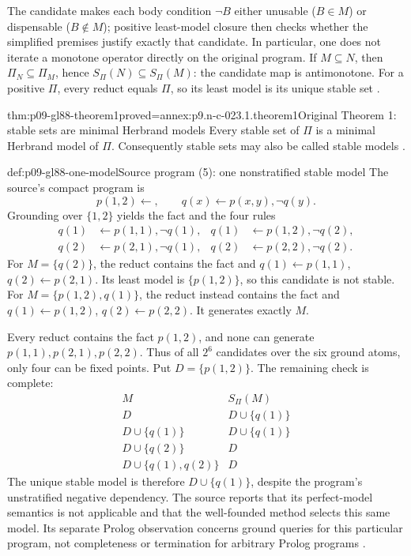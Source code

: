 The candidate makes each body condition \(\neg B\) either unusable
(\(B\in M\)) or dispensable (\(B\notin M\)); positive least-model closure
then checks whether the simplified premises justify exactly that candidate.
In particular, one does not iterate a monotone operator directly on the
original program.  If \(M\subseteq N\), then
\(\Pi_N\subseteq\Pi_M\), hence
\(S_\Pi(N)\subseteq S_\Pi(M)\): the candidate map is antimonotone.
For a positive \(\Pi\), every reduct equals \(\Pi\), so its least model
is its unique stable set \cite[\S\S2--3, pp.~4--5]{GelfondLifschitz1988}.

\begin{hbtheorem}{thm:p09-gl88-theorem1}{proved=annex:p9.n-c-023.1.theorem1}{Original Theorem 1: stable sets are minimal Herbrand models}
Every stable set of \(\Pi\) is a minimal Herbrand model of \(\Pi\).
Consequently stable sets may also be called stable models
\cite[\S2, Theorem~1 and proof, pp.~4--5]{GelfondLifschitz1988}.
\end{hbtheorem}

\begin{hbexample}{def:p09-gl88-one-model}{Source program (5): one nonstratified stable model}
The source's compact program is
\[
 p(1,2)\leftarrow,\qquad q(x)\leftarrow p(x,y),\neg q(y).
\]
Grounding over \(\{1,2\}\) yields the fact and the four rules
\[
\begin{aligned}
 q(1)&\leftarrow p(1,1),\neg q(1),&
 q(1)&\leftarrow p(1,2),\neg q(2),\\
 q(2)&\leftarrow p(2,1),\neg q(1),&
 q(2)&\leftarrow p(2,2),\neg q(2).
\end{aligned}
\]
For \(M=\{q(2)\}\), the reduct contains the fact and
\(q(1)\leftarrow p(1,1)\), \(q(2)\leftarrow p(2,1)\).
Its least model is \(\{p(1,2)\}\), so this candidate is not stable.
For \(M=\{p(1,2),q(1)\}\), the reduct instead contains the fact and
\(q(1)\leftarrow p(1,2)\), \(q(2)\leftarrow p(2,2)\).
It generates exactly \(M\).

Every reduct contains the fact \(p(1,2)\), and none can generate
\(p(1,1),p(2,1),p(2,2)\).  Thus of all \(2^6\) candidates over the
six ground atoms, only four can be fixed points.  Put \(D=\{p(1,2)\}\).
The remaining check is complete:
\[
\begin{array}{c|c}
 M&S_\Pi(M)\\\hline
 D&D\cup\{q(1)\}\\
 D\cup\{q(1)\}&D\cup\{q(1)\}\\
 D\cup\{q(2)\}&D\\
 D\cup\{q(1),q(2)\}&D
\end{array}
\]
The unique stable model is therefore \(D\cup\{q(1)\}\), despite the
program's unstratified negative dependency.  The source reports that its
perfect-model semantics is not applicable and that the well-founded method
selects this same model.  Its separate Prolog observation concerns ground
queries for this particular program, not completeness or termination for
arbitrary Prolog programs \cite[\S3, program~(5), Remarks~1--2,
pp.~5--6]{GelfondLifschitz1988}.
\end{hbexample}

